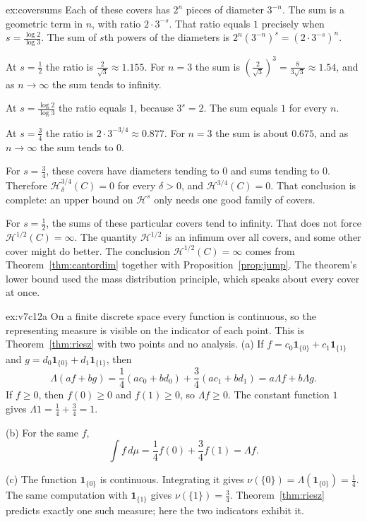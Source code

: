 \begin{solution}{ex:coversums}
\idea Each of these covers has $2^n$ pieces of diameter $3^{-n}$. The sum is a geometric term in $n$, with ratio $2\cdot 3^{-s}$. That ratio
equals $1$ precisely when $s=\frac{\log 2}{\log 3}$.
\writeup The sum of $s$th powers of the diameters is $2^n(3^{-n})^s=(2\cdot 3^{-s})^n$.

At $s=\frac12$ the ratio is $\frac{2}{\sqrt 3}\approx 1.155$. For $n=3$ the sum is $(\frac{2}{\sqrt 3})^3=\frac{8}{3\sqrt 3}\approx 1.54$, and as
$n\to\infty$ the sum tends to infinity.

At $s=\frac{\log 2}{\log 3}$ the ratio equals $1$, because $3^s=2$. The sum equals $1$ for every $n$.

At $s=\frac34$ the ratio is $2\cdot 3^{-3/4}\approx 0.877$. For $n=3$ the sum is about $0.675$, and as $n\to\infty$ the sum tends to $0$.

For $s=\frac34$, these covers have diameters tending to $0$ and sums tending to $0$. Therefore $\mathcal H^{3/4}_\delta(C)=0$ for every
$\delta>0$, and $\mathcal H^{3/4}(C)=0$. That conclusion is complete: an upper bound on $\mathcal H^s$ only needs one good family of covers.

For $s=\frac12$, the sums of these particular covers tend to infinity. That does not force $\mathcal H^{1/2}(C)=\infty$. The quantity
$\mathcal H^{1/2}$ is an infimum over all covers, and some other cover might do better. The conclusion $\mathcal H^{1/2}(C)=\infty$ comes from
Theorem~\ref{thm:cantordim} together with Proposition~\ref{prop:jump}. The theorem's lower bound used the mass distribution principle, which
speaks about every cover at once.
\end{solution}

\begin{solution}{ex:v7c12a}
\idea On a finite discrete space every function is continuous, so the representing measure is visible on the indicator of each point. This is
Theorem~\ref{thm:riesz} with two points and no analysis.
\writeup (a) If $f=c_0\mathbf 1_{\{0\}}+c_1\mathbf 1_{\{1\}}$ and $g=d_0\mathbf 1_{\{0\}}+d_1\mathbf 1_{\{1\}}$, then
\[\Lambda(af+bg)=\frac14(ac_0+bd_0)+\frac34(ac_1+bd_1)=a\Lambda f+b\Lambda g.\]
If $f\ge 0$, then $f(0)\ge 0$ and $f(1)\ge 0$, so $\Lambda f\ge 0$. The constant function $1$ gives $\Lambda 1=\frac14+\frac34=1$.

(b) For the same $f$,
\[\int f\,d\mu=\frac14 f(0)+\frac34 f(1)=\Lambda f.\]

(c) The function $\mathbf 1_{\{0\}}$ is continuous. Integrating it gives $\nu(\{0\})=\Lambda(\mathbf 1_{\{0\}})=\frac14$. The same computation
with $\mathbf 1_{\{1\}}$ gives $\nu(\{1\})=\frac34$. Theorem~\ref{thm:riesz} predicts exactly one such measure; here the two indicators exhibit
it.
\end{solution}

